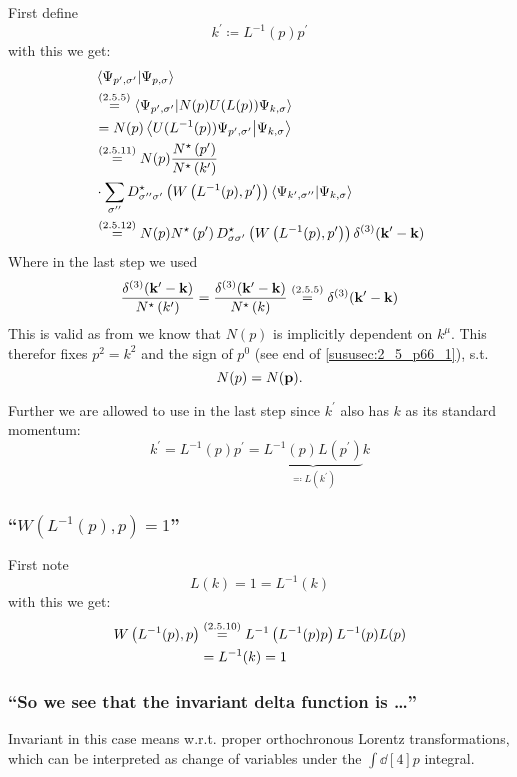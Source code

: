 First define \[k^\prime \coloneqq L^{-1}(p)p^\prime\]
with this we get:
\begin{align*} 
	&\braket{\Psi_{p^\prime,\sigma^\prime}}{\Psi_{p,\sigma}}\\
	&\overset{({2.5.5})}{=}\braket{\Psi_{p^\prime,\sigma^\prime}}{N(p)U(L(p))\Psi_{k,\sigma}}\\
	&=N(p)\braket{U(L^{-1}(p))\Psi_{p^\prime,\sigma^\prime}}{\Psi_{k,\sigma}}\\
	&\overset{({2.5.11})}{=}N(p)\dfrac{N^\star\left(p^\prime\right)}{N^\star \left(k^\prime\right)}\\
	&\cdot\sum\limits_{\sigma^{\prime\prime}}
	D_{\sigma^{\prime\prime} \sigma^{\prime}}^\star\left(W\left(L^{-1}(p),p^\prime\right)\right)
	\braket{\Psi_{k^\prime,\sigma^{\prime\prime}}}{\Psi_{k,\sigma}}\\
	&\overset{({2.5.12})}{=}N(p)N^\star\left(p^\prime\right) D_{\sigma \sigma^{\prime}}^\star\left(W\left(L^{-1}(p),p^\prime\right)\right) \delta^{(3)}(\mathbf{k}^\prime- \mathbf{k})
\end{align*}
Where in the last step we used 
\[\dfrac{\delta^{(3)}(\mathbf{k}^\prime- \mathbf{k})}{N^\star \left(k^\prime\right)}=\dfrac{\delta^{(3)}(\mathbf{k}^\prime- \mathbf{k})}{N^\star \left(k\right)}\overset{({2.5.5})}{=}\delta^{(3)}(\mathbf{k}^\prime- \mathbf{k})\]
This is valid as from   we know that $N(p)$ is implicitly dependent on $k^\mu$. 
This therefor fixes $p^2=k^2$ and the sign of $p^0$ (see end of \ref{sususec:2_5_p66_1}), s.t. \[N(p)=N(\mathbf{p}).\]

Further we are allowed to use  in the last step since $k^\prime$ also has  $k$ as its standard momentum:
\[k^\prime=L^{-1}(p)p^\prime=\underbrace{L^{-1}(p)L(p^\prime)}_{\eqqcolon L(k^\prime)}k\]

\subsubsection{\enquote{$W\left(L^{-1}(p),p\right)=1$} }
First note \[L(k)=1=L^{-1}(k)\]
with this we get:
\begin{align*} 
	W\left(L^{-1}(p),p\right)&\overset{({2.5.10})}{=}L^{-1}\left(L^{-1}(p)p\right)L^{-1}(p)L(p)\\
	&=L^{-1}(k)=1
\end{align*}

\subsubsection{\enquote{So we see that the \textbf{invariant delta function} is \dots} }
Invariant in this case means w.r.t. proper orthochronous Lorentz transformations, which can be interpreted as change of variables under the $\int \dd[4]{p}$ integral.

